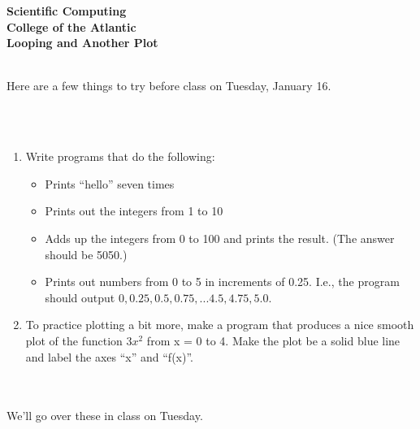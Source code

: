 \documentclass[12pt]{article}
\begin{document}
\pagestyle{empty}
 
\begin{center}
{\Large {\bf Scientific Computing}}\\
\medskip
{\large {\bf College of the Atlantic}}\\
\medskip
{\large {\bf Looping and Another Plot}}\\
\medskip
\end{center}

\hspace{2mm}\\

\noindent Here are a few things to try before class on Tuesday,
January 16. 

\hspace{2mm}\\
\hspace{2mm}\\

\begin{enumerate}
\setlength{\itemsep}{15mm}
\item Write programs that do the following:
\begin{itemize}
\setlength{\itemsep}{-1mm}
  \item Prints ``hello'' seven times
  \item Prints out the integers from 1 to 10
  \item Adds up the integers from 0 to 100 and prints the result.
    (The answer should be 5050.)
  \item Prints out numbers from 0 to 5 in increments of 0.25.  I.e.,
    the program should output $0, 0.25, 0.5, 0.75, ... 4.5, 4.75,
    5.0$. 
\end{itemize}

\item To practice plotting a bit more, make a program that produces
a nice smooth plot of the function $3x^2$ from x = 0 to 4.  Make the
plot be a solid blue line and label the axes ``x'' and ``f(x)''. 

\end{enumerate}

\hspace{2mm}\\
\hspace{2mm}\\

\noindent We'll go over these in class on Tuesday.\\
\end{document}
